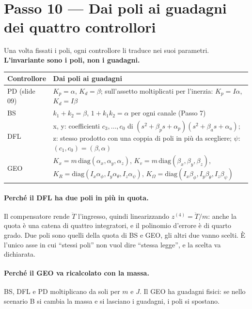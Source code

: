 \documentclass[11pt,a4paper]{article}
\begin{document}
\section{Passo 10 --- Dai poli ai guadagni dei quattro controllori}

Una volta fissati i poli, ogni controllore li traduce nei suoi parametri. \textbf{L'invariante sono i poli, non i guadagni.}

\begin{center}
\small
\begin{tabularx}{\textwidth}{@{}lL@{}}
\toprule
Controllore & Dai poli ai guadagni \\
\midrule
PD (slide 09) & $K_p = \alpha$, $K_d = \beta$; sull'assetto moltiplicati per l'inerzia: $K_p = I\alpha$, $K_d = I\beta$ \\
BS & $k_1 + k_2 = \beta$, $1 + k_1 k_2 = \alpha$ per ogni canale (Passo 7) \\
DFL & x, y: coefficienti $c_3, \dots, c_0$ di $(s^2 + \beta_p s + \alpha_p)(s^2 + \beta_a s + \alpha_a)$; z: stesso prodotto con una coppia di poli in più da scegliere; $\psi$: $(c_1, c_0) = (\beta, \alpha)$ \\
GEO & $K_x = m\,\mathrm{diag}(\alpha_x, \alpha_y, \alpha_z)$, $K_v = m\,\mathrm{diag}(\beta_x, \beta_y, \beta_z)$, $K_R = \mathrm{diag}(I_x\alpha_\phi, I_y\alpha_\theta, I_z\alpha_\psi)$, $K_\Omega = \mathrm{diag}(I_x\beta_\phi, I_y\beta_\theta, I_z\beta_\psi)$ \\
\bottomrule
\end{tabularx}
\end{center}

\paragraph{Perché il DFL ha due poli in più in quota.} Il compensatore rende $\ddot T$ l'ingresso, quindi linearizzando $z^{(4)} = \ddot T/m$: anche la quota è una catena di quattro integratori, e il polinomio d'errore è di quarto grado. Due poli sono quelli della quota di BS e GEO, gli altri due vanno scelti. È l'unico asse in cui ``stessi poli'' non vuol dire ``stessa legge'', e la scelta va dichiarata.

\paragraph{Perché il GEO va ricalcolato con la massa.} BS, DFL e PD moltiplicano da soli per $m$ e $J$. Il GEO ha guadagni fisici: se nello scenario B si cambia la massa e si lasciano i guadagni, i poli si spostano.
\end{document}
